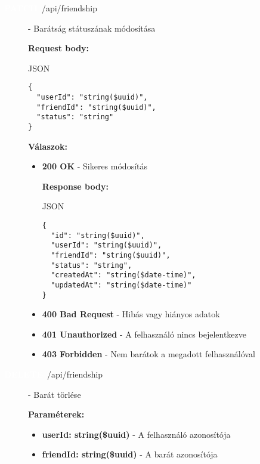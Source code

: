 \documentclass[12pt]{report}
\newcommand{\httpPatch}[1]{\colorbox{patchColor}{\textbf{\textcolor{white}{PATCH}}}~#1}
\newcommand{\httpDelete}[1]{\colorbox{deleteColor}{\textbf{\textcolor{white}{DELETE}}}~#1}
\begin{document}
\begin{itemize}
\begin{description}
  \item[\httpPatch{/api/friendship}] - Barátság státuszának módosítása
  
    \vspace{0.5cm}
    \textbf{Request body:}
    \begin{codeblock}{JSON}
      \begin{verbatim}
{
  "userId": "string($uuid)",
  "friendId": "string($uuid)",
  "status": "string"
}
      \end{verbatim}
    \end{codeblock}

    \vspace{0.5cm}
    \textbf{Válaszok:}
    \begin{itemize}
      \item \textbf{200 OK} - Sikeres módosítás

        \textbf{Response body:}
        \begin{codeblock}{JSON}
          \begin{verbatim}
{
  "id": "string($uuid)",
  "userId": "string($uuid)",
  "friendId": "string($uuid)",
  "status": "string",
  "createdAt": "string($date-time)",
  "updatedAt": "string($date-time)"
}
          \end{verbatim}
        \end{codeblock}

      \item \textbf{400 Bad Request} - Hibás vagy hiányos adatok

      \item \textbf{401 Unauthorized} - A felhasználó nincs bejelentkezve

      \item \textbf{403 Forbidden} - Nem barátok a megadott felhasználóval
      
    \end{itemize}

  \item[\httpDelete{/api/friendship}] - Barát törlése
  
    \vspace{0.5cm}
    \textbf{Paraméterek:}
    \begin{itemize}
      \item \textbf{userId: string(\$uuid)} - A felhasználó azonosítója
      \item \textbf{friendId: string(\$uuid)} - A barát azonosítója
    \end{itemize}


\end{description}
\end{itemize}
\end{document}
